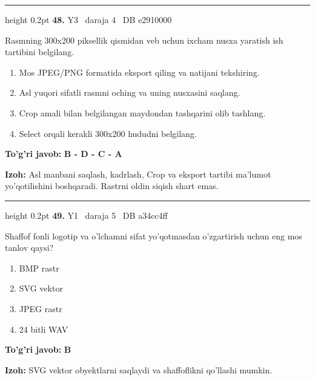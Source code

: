 \documentclass[10pt,a4paper,oneside]{article}
\begin{document}
\vspace{2mm}\hrule height 0.2pt \vspace{4mm}
\hypertarget{q48}{\textbf{\color{ink}48.}}  {\color{muted}\scriptsize Y3 \textbullet\ daraja 4 \textbullet\ DB e2910000}
\par
Rasmning 300x200 piksellik qismidan veb uchun ixcham nusxa yaratish ish tartibini belgilang.
\begin{enumerate}[label=\Alph*),leftmargin=9mm]
\item Mos JPEG/PNG formatida eksport qiling va natijani tekshiring.
\item Asl yuqori sifatli rasmni oching va uning nusxasini saqlang.
\item Crop amali bilan belgilangan maydondan tashqarini olib tashlang.
\item Select orqali kerakli 300x200 hududni belgilang.
\end{enumerate}
\begin{tcolorbox}[enhanced,breakable,colback=teal!4,colframe=teal!45!black,boxrule=0.45pt,arc=1.2mm,left=2.8mm,right=2.8mm,top=2mm,bottom=2mm,before skip=2mm,after skip=2mm]
\textbf{\color{teal}To'g'ri javob:} \textbf{B - D - C - A}
\par\smallskip
\textbf{Izoh:} Asl manbani saqlash, kadrlash, Crop va eksport tartibi ma'lumot yo'qotilishini boshqaradi. Rastrni oldin siqish shart emas.
\end{tcolorbox}
\vspace{2mm}\hrule height 0.2pt \vspace{4mm}
\hypertarget{q49}{\textbf{\color{ink}49.}}  {\color{muted}\scriptsize Y1 \textbullet\ daraja 5 \textbullet\ DB a34cc4ff}
\par
Shaffof fonli logotip va o'lchamni sifat yo'qotmasdan o'zgartirish uchun eng mos tanlov qaysi?
\begin{enumerate}[label=\Alph*),leftmargin=9mm]
\item BMP rastr
\item SVG vektor
\item JPEG rastr
\item 24 bitli WAV
\end{enumerate}
\begin{tcolorbox}[enhanced,breakable,colback=teal!4,colframe=teal!45!black,boxrule=0.45pt,arc=1.2mm,left=2.8mm,right=2.8mm,top=2mm,bottom=2mm,before skip=2mm,after skip=2mm]
\textbf{\color{teal}To'g'ri javob:} \textbf{B}
\par\smallskip
\textbf{Izoh:} SVG vektor obyektlarni saqlaydi va shaffoflikni qo'llashi mumkin.
\end{tcolorbox}
\end{document}
